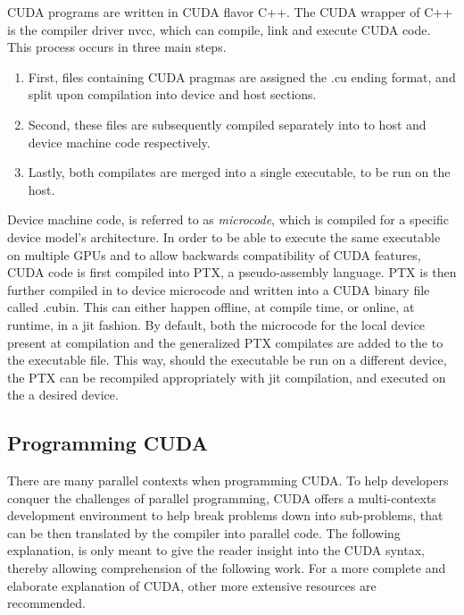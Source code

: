 CUDA programs are written in CUDA flavor C++.  The CUDA wrapper of C++ is the
compiler driver nvcc, which can compile, link and execute CUDA code.  This process occurs
 in three main steps.
 \begin{enumerate}

\item First,
files containing CUDA pragmas are assigned the .cu ending format, and split upon
compilation into device and host sections.
\item Second, these files are subsequently
compiled separately into to host and device machine code respectively.
\item Lastly, both compilates are merged into a single executable, to be run on the host.
\end{enumerate}
\par
Device machine code, is referred to as  \textit{microcode},
which is compiled for a specific device model's architecture. In order to be able
to execute the same executable
on multiple \Glspl{GPU} and to allow backwards compatibility of CUDA features, CUDA code is
first compiled into \Gls{PTX}, a pseudo-assembly language.  \Gls{PTX} is then
further compiled in to device microcode and written into a CUDA binary file called .cubin.
This can either happen offline, at compile time,
or online, at runtime, in a \gls{jit} fashion.  By default, both
the microcode for the local device present at compilation and the generalized
\gls{PTX} compilates are added to the to the executable file.
This way, should the executable be run on a different device, the \gls{PTX} can
be recompiled appropriately with \Gls{jit} compilation, and executed on the a
desired device\cite{Wilt}.

\subsection{Programming CUDA}

There are many parallel contexts when programming CUDA. To help developers conquer
the challenges of parallel programming, CUDA offers a multi-contexts development
environment to help break problems down into sub-problems, that can be then translated
by the compiler into parallel code. The following explanation, is only meant to
give the reader insight into the CUDA syntax, thereby allowing comprehension of
the following work. For a more complete and elaborate explanation of CUDA, other
more extensive resources are recommended\cite[e.g.]{Wilt,Sanders,driver}.
